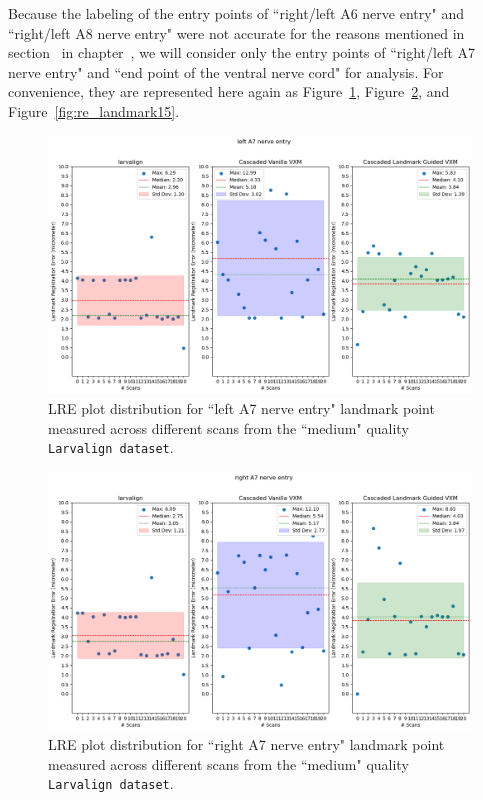 \documentclass{book}
\begin{document}
	Because the labeling of the entry points of ``right/left A6 nerve entry" and ``right/left A8 nerve entry" were not accurate for the reasons mentioned in section~ in chapter~, we will consider only the entry points of ``right/left A7 nerve entry" and ``end point of the ventral nerve cord" for analysis. For convenience, they are represented here again as Figure~\ref{fig:re_landmark22}, Figure~\ref{fig:re_landmark27}, and Figure~\ref{fig:re_landmark15}.
	
	\begin{figure}[h!]
		\centering
		\includegraphics[width=0.9\columnwidth]{resources/chapter5_fresh/output/left A7 nerve entry.png}
		\caption{LRE plot distribution for ``left A7 nerve entry" landmark point measured across different scans from the ``medium" quality \texttt{Larvalign dataset}.}
		\label{fig:re_landmark22}
	\end{figure}
	
	\begin{figure}[h!]
		\centering
		\includegraphics[width=0.9\columnwidth]{resources/chapter5_fresh/output/right A7 nerve entry.png}
		\caption{LRE plot distribution for ``right A7 nerve entry" landmark point measured across different scans from the ``medium" quality \texttt{Larvalign dataset}.}
		\label{fig:re_landmark27}
	\end{figure}
	
\end{document}
